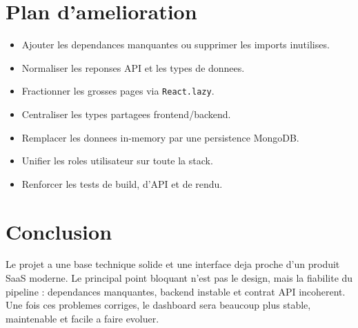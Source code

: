 \documentclass[11pt,a4paper]{article}
\begin{document}
\section{Plan d'amelioration}
\begin{itemize}[leftmargin=1.2cm]
  \item Ajouter les dependances manquantes ou supprimer les imports inutilises.
  \item Normaliser les reponses API et les types de donnees.
  \item Fractionner les grosses pages via \texttt{React.lazy}.
  \item Centraliser les types partagees frontend/backend.
  \item Remplacer les donnees in-memory par une persistence MongoDB.
  \item Unifier les roles utilisateur sur toute la stack.
  \item Renforcer les tests de build, d'API et de rendu.
\end{itemize}

\section{Conclusion}
Le projet a une base technique solide et une interface deja proche d'un produit SaaS moderne. Le principal point bloquant n'est pas le design, mais la fiabilite du pipeline : dependances manquantes, backend instable et contrat API incoherent. Une fois ces problemes corriges, le dashboard sera beaucoup plus stable, maintenable et facile a faire evoluer.
\end{document}
